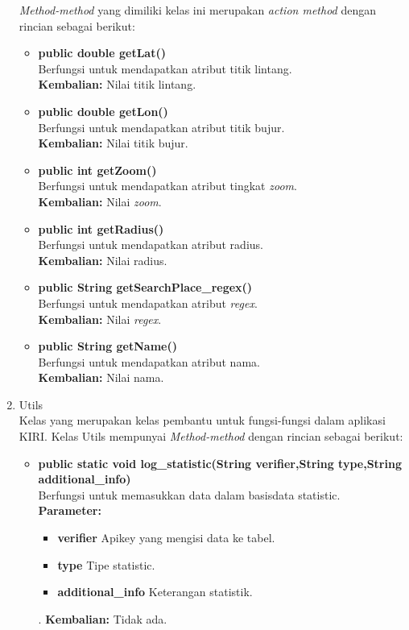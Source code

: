 \begin{enumerate}
	\textit{Method-method} yang dimiliki kelas ini merupakan \textit{action method} dengan rincian sebagai berikut:
	\begin{itemize}
		\item \textbf{public double getLat()}\\
		Berfungsi untuk mendapatkan atribut titik lintang.\\
		\textbf{Kembalian:}  Nilai titik lintang.
		
		\item \textbf{public double getLon()}\\
		Berfungsi untuk mendapatkan atribut titik bujur.\\
		\textbf{Kembalian:}  Nilai titik bujur.
		
		\item \textbf{public int getZoom()}\\
		Berfungsi untuk mendapatkan atribut tingkat \textit{zoom}.\\
		\textbf{Kembalian:}  Nilai \textit{zoom}.
		
		\item \textbf{public int getRadius()}\\
		Berfungsi untuk mendapatkan atribut radius.\\
		\textbf{Kembalian:}  Nilai radius.
		
		\item \textbf{public String getSearchPlace\_regex()}\\
		Berfungsi untuk mendapatkan atribut \textit{regex}.\\
		\textbf{Kembalian:}  Nilai \textit{regex}.
		
		\item \textbf{public String getName()}\\
		Berfungsi untuk mendapatkan atribut nama.\\
		\textbf{Kembalian:}  Nilai nama.
	\end{itemize}
	
	\item Utils\\
	Kelas yang merupakan kelas pembantu untuk fungsi-fungsi dalam aplikasi KIRI. Kelas Utils mempunyai \textit{Method-method} dengan rincian sebagai berikut:
	\begin{itemize}
	
		\item \textbf{public static void log\_statistic(String verifier,String type,String additional\_info)}\\
		Berfungsi untuk memasukkan data dalam basisdata statistic.\\
		\textbf{Parameter:}
				\begin{itemize}
					\item \textbf{verifier} Apikey yang mengisi data ke tabel.
					\item \textbf{type} Tipe statistic.
					\item \textbf{additional\_info} Keterangan statistik.
				\end{itemize}.
		\textbf{Kembalian:}  Tidak ada.
		

\end{itemize}
\end{enumerate}
